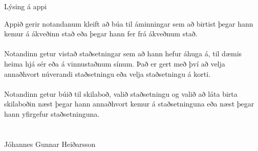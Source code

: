 \documentclass[12pt]{article}
\begin{document}
	\newcommand{\tr}{Tracker\xspace}

	{\huge Lýsing á appi\\}
	
	Appið gerir notandanum kleift að búa til áminningar sem að birtist þegar hann kemur á ákveðinn stað eða þegar 
	hann fer frá ákveðnum stað.\\
	\\
	Notandinn getur vistað staðsetningar sem að hann hefur áhuga á, til dæmis heima hjá sér eða á vinnustaðnum sínum.
	Það er gert með því að velja annaðhvort núverandi staðsetningu eða velja staðsetningu á korti.\\
	\\
	Notandinn getur búið til skilaboð, valið staðsetningu og valið að láta birta skilaboðin næst þegar hann annaðhvort kemur á staðsetninguna eða næst þegar hann yfirgefur staðsetninguna.\\
	\\
	\\
	Jóhannes Gunnar Heiðarsson
\end{document}

